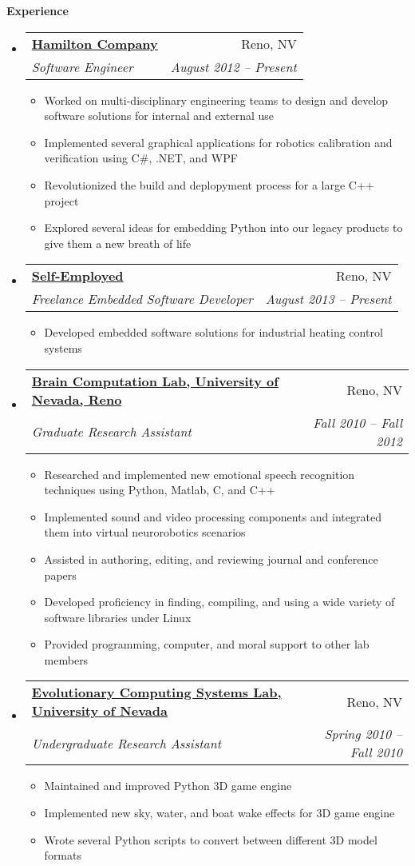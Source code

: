 \documentclass[letterpaper,11pt]{article}
\makeatletter
\newcommand{\resitem}[1]{\item #1 \vspace{-2pt}}
\newcommand{\resheading}[1]{{\large \colorbox{mygrey}{\begin{minipage}{\textwidth}{\textbf{#1 \vphantom{p\^{E}}}}\end{minipage}}}}
\newcommand{\ressubheading}[4]{
\begin{tabular*}{6.5in}{l@{\extracolsep{\fill}}r}
		\textbf{#1} & #2 \\
		\textit{#3} & \textit{#4} \\
\end{tabular*}\vspace{-6pt}}
\makeatother
\begin{document}
\resheading{Experience}
	\begin{itemize}
		\item 
			\ressubheading{\href{http://www.hamiltoncompany.com/}{Hamilton Company}}{Reno, NV}{Software Engineer}{August 2012 -- Present}
				{ \footnotesize
				\begin{itemize}
					\resitem{Worked on multi-disciplinary engineering teams to design and develop software solutions for internal and external use}
					\resitem{Implemented several graphical applications for robotics calibration and verification using C\#, .NET, and WPF}
					\resitem{Revolutionized the build and deplopyment process for a large C++ project}
					\resitem{Explored several ideas for embedding Python into our legacy products to give them a new breath of life}					
				\end{itemize}
				}		
				
		\item 
			\ressubheading{\href{http://gferneyhough.com/}{Self-Employed}}{Reno, NV}{Freelance Embedded Software Developer}{August 2013 -- Present}
				{ \footnotesize
				\begin{itemize}
					\resitem{Developed embedded software solutions for industrial heating control systems}
				\end{itemize}
				}
				
		\item 
			\ressubheading{\href{http://www.cse.unr.edu/brain/}{Brain Computation Lab, University of Nevada, Reno}}{Reno, NV}{Graduate Research Assistant}{Fall 2010 -- Fall 2012}
				{ \footnotesize
				\begin{itemize}
					\resitem{Researched and implemented new emotional speech recognition techniques using Python, Matlab, C, and C++}
					\resitem{Implemented sound and video processing components and integrated them into virtual neurorobotics scenarios}
					\resitem{Assisted in authoring, editing, and reviewing journal and conference papers}
					\resitem{Developed proficiency in finding, compiling, and using a wide variety of software libraries under Linux}
					\resitem{Provided programming, computer, and moral support to other lab members}
				\end{itemize}
				}
		\item 
			\ressubheading{\href{http://ecsl.cse.unr.edu/}{Evolutionary Computing Systems Lab, University of Nevada}}{Reno, NV}{Undergraduate Research Assistant}{Spring 2010 -- Fall 2010}
				{ \footnotesize
				\begin{itemize}
					\resitem{Maintained and improved Python 3D game engine}
					\resitem{Implemented new sky, water, and boat wake effects for 3D game engine}
					\resitem{Wrote several Python scripts to convert between different 3D model formats}
				\end{itemize}
				}

	\end{itemize}  %
\end{document}
